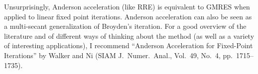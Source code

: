 \documentclass[12pt, leqno]{article} %
\begin{document}
Unsurprisingly, Anderson acceleration (like RRE) is equivalent to
GMRES when applied to linear fixed point iterations.  Anderson
acceleration can also be seen as a multi-secant generalization of
Broyden's iteration.  For a good overview of the literature and of
different ways of thinking about the method (as well as a variety of
interesting applications), I recommend ``Anderson Acceleration for
Fixed-Point Iterations'' by Walker and Ni (SIAM J.~Numer.~Anal.,
Vol.~49, No.~4, pp.~1715--1735).
\end{document}
